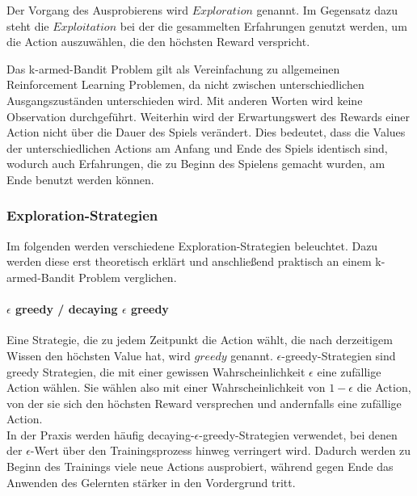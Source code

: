 \documentclass[11pt]{scrartcl}
\begin{document}
Der Vorgang des Ausprobierens wird $Exploration$ genannt. Im Gegensatz dazu steht die
$Exploitation$ bei der die gesammelten Erfahrungen genutzt werden, um die Action
auszuwählen, die den höchsten Reward verspricht.

Das k-armed-Bandit Problem gilt als Vereinfachung zu allgemeinen Reinforcement Learning
Problemen, da nicht zwischen unterschiedlichen Ausgangszuständen unterschieden wird. Mit
anderen Worten wird keine Observation durchgeführt. Weiterhin wird der Erwartungswert des
Rewards einer Action nicht über die Dauer des Spiels verändert. Dies bedeutet, dass die
Values der unterschiedlichen Actions am Anfang und Ende des Spiels identisch sind, wodurch
auch Erfahrungen, die zu Beginn des Spielens gemacht wurden, am Ende benutzt werden
können.

\subsubsection{Exploration-Strategien}
Im folgenden werden verschiedene Exploration-Strategien beleuchtet. Dazu werden diese erst
theoretisch erklärt und anschließend praktisch an einem k-armed-Bandit Problem verglichen.

\paragraph{$\epsilon$ greedy / decaying $\epsilon$ greedy}
Eine Strategie, die zu jedem Zeitpunkt die Action wählt, die nach derzeitigem Wissen den
höchsten Value hat, wird $greedy$ genannt. $\epsilon$-greedy-Strategien sind greedy
Strategien, die mit einer gewissen Wahrscheinlichkeit $\epsilon$ eine zufällige Action
wählen. Sie wählen also mit einer Wahrscheinlichkeit von $1 - \epsilon$ die Action, von
der sie sich den höchsten Reward versprechen und andernfalls eine zufällige Action.\\
In der Praxis werden häufig decaying-$\epsilon$-greedy-Strategien verwendet, bei denen der
$\epsilon$-Wert über den Trainingsprozess hinweg verringert wird. Dadurch werden zu Beginn
des Trainings viele neue Actions ausprobiert, während gegen Ende das Anwenden des
Gelernten stärker in den Vordergrund tritt.
\end{document}
